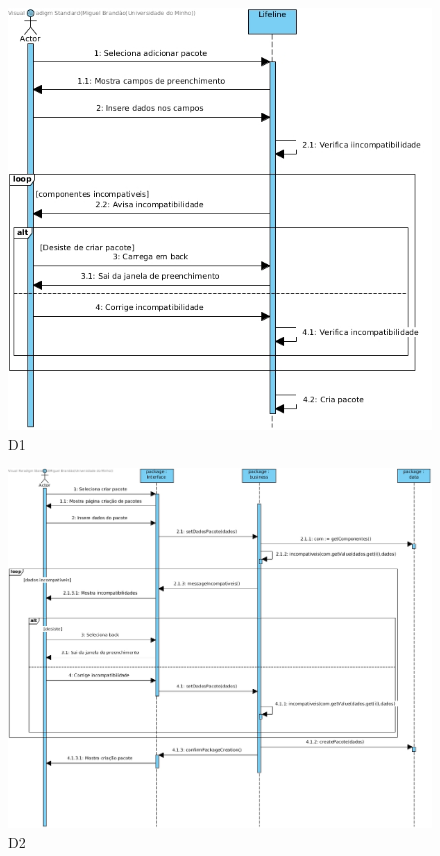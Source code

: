 \begin{figure}[H]
    \centering
    \includegraphics[width=\textwidth]{diagramas_de_sequencia/imgs/UserSystemUC4D1.jpg}
    \caption{D1}
\end{figure}
\begin{figure}[H]
    \centering
    \includegraphics[width=\textwidth]{diagramas_de_sequencia/imgs/UserSystemUC4D2.jpg}
    \caption{D2}
\end{figure}
